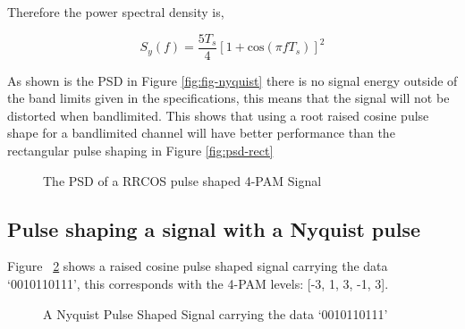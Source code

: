 Therefore the power spectral density is,

\begin{equation}
    \label{eqn:psd-nyquist}
    S_y(f) = \frac{5T_s}{4}[1+\textrm{cos}(\pi f T_s)]^2
\end{equation}

As shown is the PSD in Figure \ref{fig:fig-nyquist} there is no signal energy outside of the band limits
given in the specifications, this means that the signal will not be distorted when bandlimited. This shows
that using a root raised cosine pulse shape for a bandlimited channel will have better performance than
the rectangular pulse shaping in Figure \ref{fig:psd-rect}

\begin{figure}[h]
    \begin{center}
        
        \caption{The PSD of a RRCOS pulse shaped 4-PAM Signal}
        \label{fig:psd-nyquist}
    \end{center}
\end{figure}

\subsection{Pulse shaping a signal with a Nyquist pulse}

Figure ~\ref{fig:ny-pulse-shape} shows a raised cosine pulse shaped signal carrying the data `0010110111', this corresponds with the 4-PAM
levels: [-3, 1, 3, -1, 3].

\begin{figure}[H]
    \begin{center}
        
    \end{center}
    \label{fig:ny-pulse-shape}
    \caption{A Nyquist Pulse Shaped Signal carrying the data `0010110111'}
\end{figure}


    
